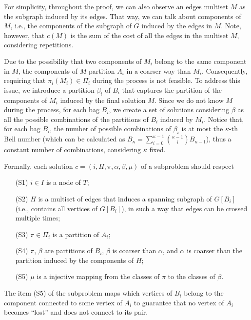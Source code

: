 For simplicity, throughout the proof, we can also observe an edges multiset \(M\) as the subgraph induced by its edges. That way, we can talk about components of \(M\), i.e., the components of the subgraph of $G$ induced by the edges in \(M\). Note, however, that \(c(M)\) is the sum of the cost of all the edges in the multiset \(M\), considering repetitions.

Due to the possibility that two components of \(M_i\) belong to the same component in \(M\), the components of \(M\) partition \(A_i\) in a coarser way than \(M_i\). Consequently, requiring that \(\pi_i(M_i) \in \Pi_i\) during the process is not feasible. To address this issue, we introduce a partition \(\beta_i\) of \(B_i\) that captures the partition of the components of \(M_i\) induced by the final solution \(M\). Since we do not know \(M\) during the process, for each bag \(B_i\), we create a set of solutions considering \(\beta\) as all the possible combinations of the partitions of \(B_i\) induced by \(M_i\). Notice that, for each bag \(B_i\), the number of possible combinations of \(\beta_i\) is at most the \(\kappa\)-th Bell number (which can be calculated as \(B_{\kappa} = \sum_{i=0}^{\kappa - 1} \binom{\kappa - 1}{i} B_{\kappa - 1}\)), thus a constant number of combinations, considering \(\kappa\) fixed.

Formally, each solution \(c = (i, H, \pi, \alpha, \beta, \mu)\) of a subproblem should respect

\begin{itemize}
    \item[(S1)] \(i \in I\) is a node of \(T\);
    \item[(S2)] \(H\) is a multiset of edges that induces a spanning subgraph of \(G[B_i]\) (i.e., contains all vertices of \(G[B_i]\)), in such a way that edges can be crossed multiple times;
    \item[(S3)] \(\pi \in \Pi_i\) is a partition of \(A_i\);
    \item[(S4)] \(\pi\), \(\beta\) are partitions of \(B_i\), \(\beta\) is coarser than \(\alpha\), and \(\alpha\) is coarser than the partition induced by the components of \(H\);
    \item[(S5)] \(\mu\) is a injective mapping from the classes of \(\pi\) to the classes of \(\beta\).
\end{itemize}

The item (S5) of the subproblem maps which vertices of \(B_i\) belong to the component connected to some vertex of \(A_i\) to guarantee that no vertex of \(A_i\) becomes ``lost'' and does not connect to its pair.

